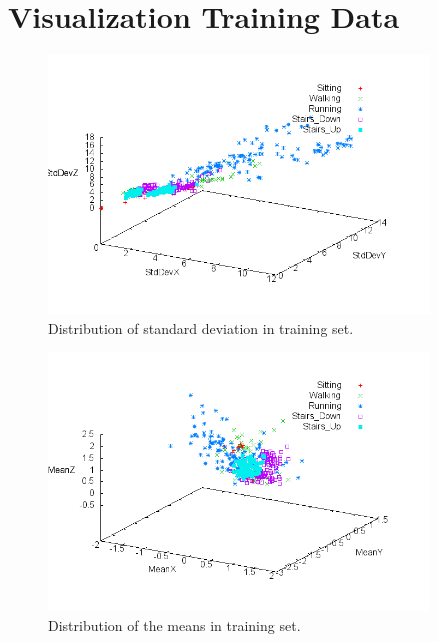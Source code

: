 \chapter{Visualization Training Data}
\label{sec:app-visualization-training}


\begin{figure}[ht]
    \centering
%    
    \includegraphics[width=0.9\textwidth]{../../data/training-plots/StdDev.png}
    \caption{Distribution of standard deviation in training set.}
    \label{fig:training-plot-stddev}
\end{figure}

\begin{figure}[ht]
    \centering
%    
    \includegraphics[width=0.9\textwidth]{../../data/training-plots/Means.png}
    \caption{Distribution of the means in training set.}
    \label{fig:training-plot-means}
\end{figure}

